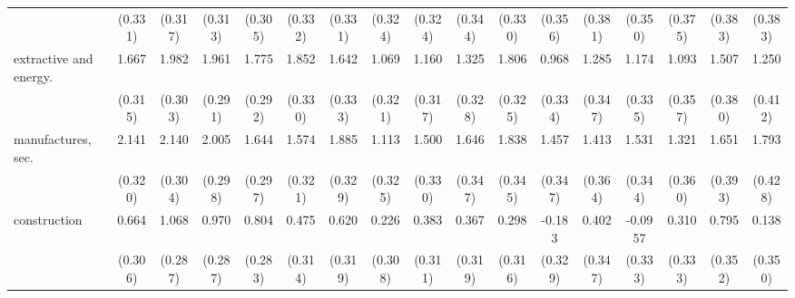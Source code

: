 {\begin{tabular}{l*{16}{c}}
                    &     (0.331)         &     (0.317)         &     (0.313)         &     (0.305)         &     (0.332)         &     (0.331)         &     (0.324)         &     (0.324)         &     (0.344)         &     (0.330)         &     (0.356)         &     (0.381)         &     (0.350)         &     (0.375)         &     (0.383)         &     (0.383)         \\
[1em]
extractive and energy.&       1.667\sym{***}&       1.982\sym{***}&       1.961\sym{***}&       1.775\sym{***}&       1.852\sym{***}&       1.642\sym{***}&       1.069\sym{***}&       1.160\sym{***}&       1.325\sym{***}&       1.806\sym{***}&       0.968\sym{**} &       1.285\sym{***}&       1.174\sym{***}&       1.093\sym{**} &       1.507\sym{***}&       1.250\sym{**} \\
                    &     (0.315)         &     (0.303)         &     (0.291)         &     (0.292)         &     (0.330)         &     (0.333)         &     (0.321)         &     (0.317)         &     (0.328)         &     (0.325)         &     (0.334)         &     (0.347)         &     (0.335)         &     (0.357)         &     (0.380)         &     (0.412)         \\
[1em]
manufactures, sec.  &       2.141\sym{***}&       2.140\sym{***}&       2.005\sym{***}&       1.644\sym{***}&       1.574\sym{***}&       1.885\sym{***}&       1.113\sym{***}&       1.500\sym{***}&       1.646\sym{***}&       1.838\sym{***}&       1.457\sym{***}&       1.413\sym{***}&       1.531\sym{***}&       1.321\sym{***}&       1.651\sym{***}&       1.793\sym{***}\\
                    &     (0.320)         &     (0.304)         &     (0.298)         &     (0.297)         &     (0.321)         &     (0.329)         &     (0.325)         &     (0.330)         &     (0.347)         &     (0.345)         &     (0.347)         &     (0.364)         &     (0.344)         &     (0.360)         &     (0.393)         &     (0.428)         \\
[1em]
construction        &       0.664\sym{*}  &       1.068\sym{***}&       0.970\sym{***}&       0.804\sym{**} &       0.475         &       0.620         &       0.226         &       0.383         &       0.367         &       0.298         &      -0.183         &       0.402         &     -0.0957         &       0.310         &       0.795\sym{*}  &       0.138         \\
                    &     (0.306)         &     (0.287)         &     (0.287)         &     (0.283)         &     (0.314)         &     (0.319)         &     (0.308)         &     (0.311)         &     (0.319)         &     (0.316)         &     (0.329)         &     (0.347)         &     (0.333)         &     (0.333)         &     (0.352)         &     (0.350)         \\

\end{tabular}}
